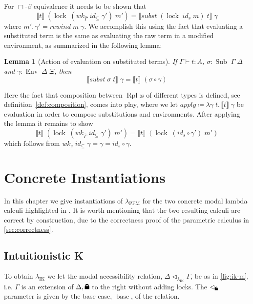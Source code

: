 \documentclass[12pt,twoside,openright]{report}
\numberwithin{equation}{chapter}
\numberwithin{figure}{chapter}
\numberwithin{table}{chapter}
\newtheorem{lemma}[theorem]{Lemma}
\theoremstyle{definition}\newtheorem{definition}{Definition}
\newcommand{\lock}{\text{\tikz[baseline]{
      \fill[rounded corners=.1ex] (-.75ex,0) rectangle (.75ex,1ex);
      \draw[line width=.3ex] (-.4ex,.5ex) -- ++(0,.75ex) arc (180:0:.4ex) -- ++(0,-.75ex);
}}}
\begin{document}
For $\Box\text{-}\beta$ equivalence it needs to be shown that
$$ \llbracket t \rrbracket \; (\operatorname{lock} \; (\textit{wk}_{\widehat\Gamma} \; \textit{id}_\subseteq \; \gamma') \; m') = \llbracket \textit{subst} \; (\operatorname{lock} \; \textit{id}_s \; m) \; t \rrbracket \; \gamma $$
where $m' , \gamma' = \textit{rewind} \; m \; \gamma$.
We accomplish this using the fact that evaluating a substituted term
is the same as evaluating the raw term in a modified environment,
as summarized in the following lemma:
\begin{lemma}[Action of evaluation on substituted terms]
  If $\Gamma \vdash t : A$, $\sigma : \operatorname{Sub} \; \Gamma \; \Delta$
  and $\gamma : \operatorname{Env} \; \Delta \; \Xi$, then
  $$ \llbracket \textit{subst} \; \sigma \; t \rrbracket \; \gamma = \llbracket t \rrbracket \; (\sigma \circ \gamma) $$
\end{lemma}
Here the fact that composition between $\operatorname{Rpl}$:s of different types is defined,
see definition~\ref{def:composition}, comes into play,
where we let $\textit{apply} \coloneqq \lambda \gamma \; t.\, \llbracket t \rrbracket \; \gamma$ be evaluation
in order to compose substitutions and environments.
After applying the lemma it remains to show
$$ \llbracket t \rrbracket \; (\operatorname{lock} \; (\textit{wk}_{\widehat\Gamma} \; \textit{id}_\subseteq \; \gamma') \; m') = \llbracket t \rrbracket \; (\operatorname{lock} \; (\textit{id}_s \circ \gamma') \; m') $$
which follows from
$wk_e \; \textit{id}_\subseteq \; \gamma = \gamma = \textit{id}_s \circ \gamma$.

\chapter{Concrete Instantiations}\label{sec:instantiations}

In this chapter we give instantiations of $\lambda_\text{PFM}$
for the two concrete modal lambda calculi highlighted in \cite{valliappan22}.
It is worth mentioning that the two resulting calculi are correct by construction,
due to the correctness proof of the parametric calculus in \autoref{sec:correctness}.

\section{Intuitionistic K}\label{sec:ik}

To obtain $\lambda_\text{IK}$ we let the modal accessibility relation,
$\Delta \lhd_{\lambda_\text{IK}} \Gamma$, be as in \autoref{fig:ik-m},
i.e. $\Gamma$ is an extension of $\Delta, \lock$ to the right without adding locks.
The $\lhd_\lock$ parameter is given by the base case, $\operatorname{base}$, of the relation.
\end{document}
